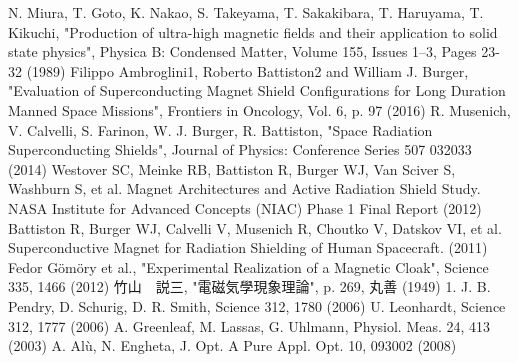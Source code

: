 \newpage
\begin{thebibliography}{11}
   N. Miura, T. Goto, K. Nakao, S. Takeyama, T. Sakakibara, T. Haruyama, T. Kikuchi, "Production of ultra-high magnetic fields and their application to solid state physics", Physica B: Condensed Matter, Volume 155, Issues 1–3, Pages 23-32 (1989)
   Filippo Ambroglini1, Roberto Battiston2 and William J. Burger, "Evaluation of Superconducting Magnet Shield Configurations for Long Duration Manned Space Missions", Frontiers in Oncology, Vol. 6, p. 97 (2016)
   R. Musenich, V. Calvelli, S. Farinon, W. J. Burger, R. Battiston, "Space Radiation Superconducting Shields", Journal of Physics: Conference Series 507 032033 (2014)
   Westover SC, Meinke RB, Battiston R, Burger WJ, Van Sciver S, Washburn S, et al. Magnet Architectures and Active Radiation Shield Study. NASA Institute for Advanced Concepts (NIAC) Phase 1 Final Report (2012)
   Battiston R, Burger WJ, Calvelli V, Musenich R, Choutko V, Datskov VI, et al. Superconductive Magnet for Radiation Shielding of Human Spacecraft. (2011)
   Fedor Gömöry et al., "Experimental Realization of a Magnetic Cloak", Science 335, 1466 (2012)
   竹山　説三, "電磁気學現象理論", p. 269, 丸善 (1949)
   1. J. B. Pendry, D. Schurig, D. R. Smith, Science 312, 1780 (2006)
   U. Leonhardt, Science 312, 1777 (2006)
   A. Greenleaf, M. Lassas, G. Uhlmann, Physiol. Meas. 24, 413 (2003)
   A. Alù, N. Engheta, J. Opt. A Pure Appl. Opt. 10, 093002 (2008)
\end{thebibliography}
